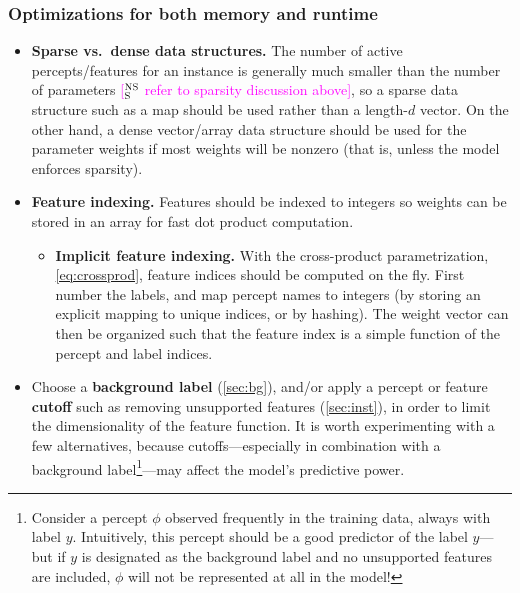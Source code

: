 \documentclass[11pt,letterpaper]{article}
\newcommand{\ensuretext}[1]{#1}
\newcommand{\nssmarker}{\ensuretext{\textcolor{magenta}{\ensuremath{^{\textsc{NS}}_{\textsc{S}}}}}}
\newcommand{\arkcomment}[3]{\ensuretext{\textcolor{#3}{[#1 #2]}}}
\newcommand{\nss}[1]{\arkcomment{\nssmarker}{#1}{magenta}}
\begin{document}
\subsubsection{Optimizations for both memory and runtime}

\begin{itemize}
\item \textbf{Sparse vs.~dense data structures.} 
The number of active percepts\slash features for an instance 
is generally much smaller than the number of parameters \nss{refer to sparsity discussion above}, 
so a sparse data structure such as a map should be used rather than a length-$d$ vector.
On the other hand, a dense vector/array data structure should be used for the parameter weights
if most weights will be nonzero (that is, unless the model enforces sparsity).

\item \textbf{Feature indexing.}
Features should be indexed to integers so weights can be stored in an array for fast dot product computation.
\begin{itemize}
\item \textbf{Implicit feature indexing.} 
With the cross-product parametrization, \cref{eq:crossprod}, 
feature indices should be computed on the fly.
First number the labels, 
and map percept names to integers (by storing an explicit mapping to unique indices, or by hashing).
The weight vector can then be organized such that the feature index 
is a simple function of the percept and label indices.
\end{itemize}

\item Choose a \textbf{background label} (\cref{sec:bg}), 
and\slash or apply a percept or feature \textbf{cutoff} 
such as removing unsupported features (\cref{sec:inst}), 
in order to limit the dimensionality of the feature function.
It is worth experimenting with a few alternatives, because cutoffs---especially 
in combination with a background label\footnote{Consider a percept $\phi$ observed frequently in the training
data, always with label $y$. Intuitively, this percept should be a good predictor of the label $y$---but
if $y$ is designated as the background label and no unsupported features are included,
$\phi$ will not be represented at all in the model!}---may affect the model's predictive power.
\end{itemize}
\end{document}
